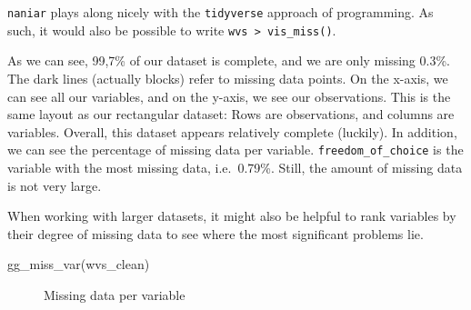 \documentclass[
  letterpaper,
]{krantz}
\makeatletter
\newenvironment{Shaded}{\begin{snugshade}}{\end{snugshade}}
\newcommand{\FunctionTok}[1]{\textcolor[rgb]{0.28,0.35,0.67}{#1}}
\newcommand{\NormalTok}[1]{\textcolor[rgb]{0.00,0.23,0.31}{#1}}
\newenvironment{kframe}{%
\medskip{}
\setlength{\fboxsep}{.8em}
 \def\at@end@of@kframe{}%
 \ifinner\ifhmode%
  \def\at@end@of@kframe{\end{minipage}}%
  \begin{minipage}{\columnwidth}%
 \fi\fi%
 \def\FrameCommand##1{\hskip\@totalleftmargin \hskip-\fboxsep
 \colorbox{shadecolor}{##1}\hskip-\fboxsep
     \hskip-\linewidth \hskip-\@totalleftmargin \hskip\columnwidth}%
 \MakeFramed {\advance\hsize-\width
   \@totalleftmargin\z@ \linewidth\hsize
   \@setminipage}}%
 {\par\unskip\endMakeFramed%
 \at@end@of@kframe}
\renewenvironment{Shaded}{\begin{kframe}}{\end{kframe}}
\makeatother
\begin{document}
\texttt{naniar} plays along nicely with the \texttt{tidyverse} approach
of programming. As such, it would also be possible to write
\texttt{wvs\ \textbar{}\textgreater{}\ vis\_miss()}.

As we can see, 99,7\% of our dataset is complete, and we are only
missing 0.3\%. The dark lines (actually blocks) refer to missing data
points. On the x-axis, we can see all our variables, and on the y-axis,
we see our observations. This is the same layout as our rectangular
dataset: Rows are observations, and columns are variables. Overall, this
dataset appears relatively complete (luckily). In addition, we can see
the percentage of missing data per variable.
\texttt{freedom\_of\_choice} is the variable with the most missing data,
i.e.~0.79\%. Still, the amount of missing data is not very large.

When working with larger datasets, it might also be helpful to rank
variables by their degree of missing data to see where the most
significant problems lie.

\begin{Shaded}
\begin{Highlighting}[]
\FunctionTok{gg\_miss\_var}\NormalTok{(wvs\_clean)}
\end{Highlighting}
\end{Shaded}

\begin{figure}[H]


\caption{\label{fig-missing-data-per-variable}Missing data per variable}

\end{figure}%
\end{document}
